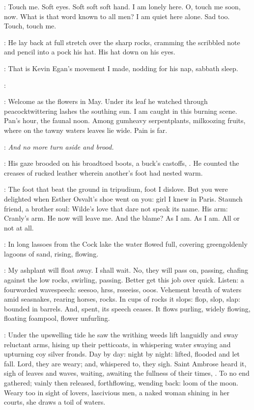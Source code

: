 \StephenInt:
Touch me.
Soft eyes.
Soft soft soft hand.
I am lonely here.
O, touch me soon, now.
What is that word known to all men?
I am quiet here alone.
Sad too.
Touch, touch me.

:
He lay back at full stretch over the sharp rocks,
cramming the scribbled note and pencil into a pock his hat.
His hat down on his eyes.

\StephenInt:
That is Kevin Egan's movement I made,
nodding for his nap, sabbath sleep.

\kevin:

\StephenInt:
Welcome as the flowers in May.
Under its leaf he watched through peacocktwittering lashes
the southing sun.
I am caught in this burning scene.
Pan's hour, the faunal noon.
Among gumheavy serpentplants, milkoozing fruits,
where on the tawny waters leaves lie wide.
Pain is far.

\StephenInt:
\emph{And no more turn aside and brood.}

:
His gaze brooded on his broadtoed boots, a buck's castoffs, .
He counted the creases of rucked leather wherein another's foot had nested warm.

\StephenInt:
The foot that beat the ground in tripudium,
foot I dislove.
But you were delighted when Esther Osvalt's shoe went on you:
girl I knew in Paris.
Staunch friend, a brother soul:
Wilde's love that dare not speak its name.
His arm:
Cranly's arm.
He now will leave me.
And the blame?
As I am.
As I am.
All or not at all.

:
In long lassoes from the Cock lake
the water flowed full,
covering greengoldenly lagoons of sand,
rising, flowing.

\StephenInt:
My ashplant will float away.
I shall wait.
No, they will pass on, passing,
chafing against the low rocks, swirling, passing.
Better get this job over quick.
Listen:
a fourworded wavespeech:
seesoo, hrss, rsseeiss, ooos.
Vehement breath of waters
amid seasnakes, rearing horses, rocks.
In cups of rocks it slops:
flop, slop, slap:
bounded in barrels.
And, spent, its speech ceases.
It flows purling,
widely flowing,
floating foampool,
flower unfurling.

:
Under the upswelling tide
he saw the writhing weeds lift languidly
and sway reluctant arms,
hising up their petticoats,
in whispering water swaying and upturning coy silver fronds.
Day by day:
night by night:
lifted, flooded and let fall.
Lord, they are weary;
and, whispered to, they sigh.
Saint Ambrose heard it,
sigh of leaves and waves,
waiting, awaiting the fullness of their times,
.
To no end gathered;
vainly then released, forthflowing,
wending back:
loom of the moon.
Weary too in sight of lovers,
lascivious men,
a naked woman shining in her courts,
she draws a toil of waters.

